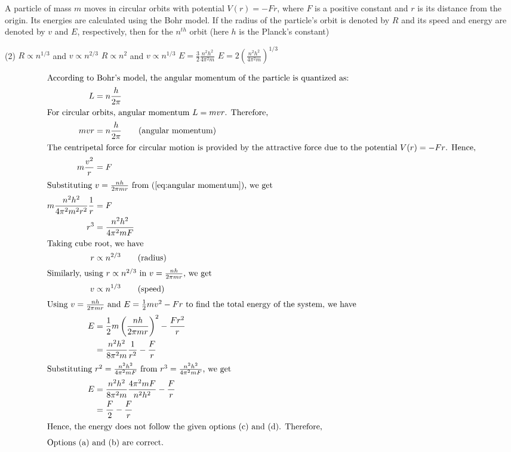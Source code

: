 \item A particle of mass \(m\) moves in circular orbits with potential \(V(r) = -Fr\), where \(F\) is a positive constant and \(r\) is its distance from the origin. Its energies are calculated using the Bohr model. If the radius of the particle's orbit is denoted by \(R\) and its speed and energy are denoted by \(v\) and \(E\), respectively, then for the \(n^{th}\) orbit (here \(h\) is the Planck's constant)
\begin{tasks}(2)
\task \(R \propto n^{1/3}\) and \(v \propto n^{2/3}\)
\task \(R \propto n^2\) and \(v \propto n^{1/3}\)
\task \(E = \frac{3}{2}\frac{n^2h^2}{4\pi^2 m}\)
\task \(E = 2\left(\frac{n^2h^2}{4\pi^2 m}\right)^{1/3}\)
\end{tasks}

\begin{solution}
    \begin{align*}
        \intertext{According to Bohr’s model, the angular momentum of the particle is quantized as:}
        L &= n\frac{h}{2\pi} \\
        \intertext{For circular orbits, angular momentum $L = mvr$. Therefore,}
        mvr &= n\frac{h}{2\pi} \tag{angular momentum}\\
        \intertext{The centripetal force for circular motion is provided by the attractive force due to the potential $V(r) = -Fr$. Hence,}
        m\frac{v^2}{r} &= F\\
        \intertext{Substituting $v = \frac{nh}{2\pi mr}$ from (\ref{eq:angular momentum}), we get}
        m\frac{n^2h^2}{4\pi^2 m^2 r^2}\frac{1}{r} &= F\\
        r^3 &= \frac{n^2h^2}{4\pi^2 mF}\\
        \intertext{Taking cube root, we have }
        r &\propto n^{2/3} \tag{radius} \\
        \intertext{Similarly, using $r \propto n^{2/3}$ in $v = \frac{nh}{2\pi mr}$, we get}
        v &\propto n^{1/3} \tag{speed} \\
        \intertext{Using $v = \frac{nh}{2\pi mr}$ and $E = \frac{1}{2}mv^2 - Fr$ to find the total energy of the system, we have}
        E &= \frac{1}{2}m\left(\frac{nh}{2\pi mr}\right)^2 - \frac{Fr^2}{r}\\
        &= \frac{n^2h^2}{8\pi^2m}\frac{1}{r^2} - \frac{F}{r} \\
        \intertext{Substituting $r^2 = \frac{n^2h^2}{4\pi^2 mF}$ from $r^3 = \frac{n^2h^2}{4\pi^2 mF}$, we get}
        E &= \frac{n^2h^2}{8\pi^2m}\frac{4\pi^2 mF}{n^2h^2} - \frac{F}{r}\\
        &= \frac{F}{2} - \frac{F}{r} \\
        \intertext{Hence, the energy does not follow the given options (c) and (d). Therefore,}
        \intertext{Options (a) and (b) are correct.}
    \end{align*}
\end{solution}
